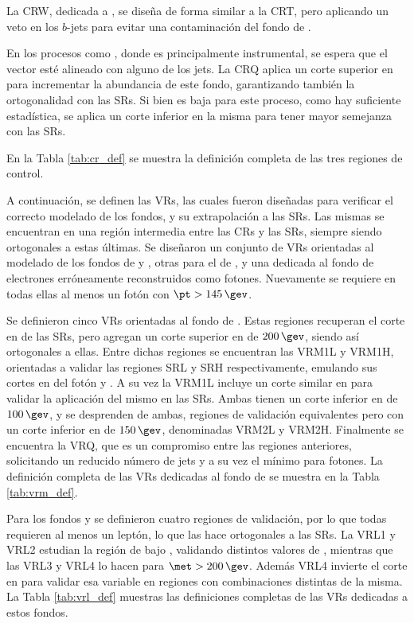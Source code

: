 La CRW, dedicada a \wph, se diseña de forma similar a la CRT, pero aplicando un veto en los $b$-jets para evitar una contaminación del fondo de \ttbarph.

En los procesos como \phj, donde \met es principalmente instrumental, se espera que el vector \met esté alineado con alguno de los jets. La CRQ aplica un corte superior en \dphijetmet para incrementar la abundancia de este fondo, garantizando también la ortogonalidad con las SRs. Si bien \met es baja para este proceso, como hay suficiente estadística, se aplica un corte inferior en la misma para tener mayor semejanza con las SRs.

En la Tabla \ref{tab:cr_def} se muestra la definición completa de las tres regiones de control. 




A continuación, se definen las VRs, las cuales fueron diseñadas para verificar el correcto modelado de los fondos, y su extrapolación a las SRs. Las mismas se encuentran en una región intermedia entre las CRs y las SRs, siempre siendo ortogonales a estas últimas. Se diseñaron un conjunto de VRs orientadas al modelado de los fondos de \wph y \ttbarph, otras para el de \phj, y una dedicada al fondo de electrones erróneamente reconstruidos como fotones. Nuevamente se requiere en todas ellas al menos un fotón con $\pt>145\,\gev$.

Se definieron cinco VRs orientadas al fondo de \phj. Estas regiones recuperan el corte en \dphijetmet de las SRs, pero agregan un corte superior en \met de $200\,\gev$, siendo así ortogonales a ellas. Entre dichas regiones se encuentran las VRM1L y VRM1H, orientadas a validar las regiones SRL y SRH respectivamente, emulando sus cortes en \pt del fotón y \met. A su vez la VRM1L incluye un corte similar en \rtf para validar la aplicación del mismo en las SRs. Ambas tienen un corte inferior en \met de $100\,\gev$, y se desprenden de ambas, regiones de validación equivalentes pero con un corte inferior en \met de $150\,\gev$, denominadas VRM2L y VRM2H. Finalmente se encuentra la VRQ, que es un compromiso entre las regiones anteriores, solicitando un reducido número de jets y a su vez el mínimo \pt para fotones. La definición completa de las VRs dedicadas al fondo de \phj se muestra en la Tabla \ref{tab:vrm_def}.


Para los fondos \wph y \ttbarph se definieron cuatro regiones de validación, por lo que todas requieren al menos un leptón, lo que las hace ortogonales a las SRs. La VRL1 y VRL2 estudian la región de bajo \met, validando distintos valores de \HT, mientras que las VRL3 y VRL4 lo hacen para $\met>200\,\gev$. Además VRL4 invierte el corte en \dphijetmet para validar esa variable en regiones con combinaciones distintas de la misma. La Tabla \ref{tab:vrl_def} muestras las definiciones completas de las VRs dedicadas a estos fondos.

